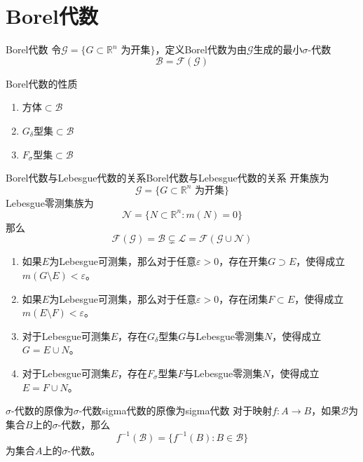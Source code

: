 \documentclass[lang = cn, scheme = chinese, thmcnt = section]{elegantbook}
\newcommand{\R}{\mathbb{R}}            %
\newcommand{\sub}{\subset}             %
\begin{document}
\section{Borel代数}

\begin{definition}{Borel代数}
	令$\mathscr{G}=\{ G\sub\R^n\text{ 为开集} \}$，定义Borel代数为由$\mathscr{G}$生成的最小$\sigma$-代数
	$$
	\mathscr{B}=\mathscr{F}(\mathscr{G})
	$$
\end{definition}

\begin{proposition}{Borel代数的性质}
	\begin{enumerate}
		\item 方体$\sub\mathscr{B}$
		\item $G_\delta$型集$\sub\mathscr{B}$
		\item $F_\sigma$型集$\sub\mathscr{B}$
	\end{enumerate}
\end{proposition}

\begin{theorem}{Borel代数与Lebesgue代数的关系}{Borel代数与Lebesgue代数的关系}
	开集族为
	$$
	\mathscr{G}=\{ G\sub\R^n\text{ 为开集} \}
	$$
	Lebesgue零测集族为
	$$
	\mathscr{N}=\{ N\sub\R^n:m(N)=0 \}
	$$
	那么
	$$
	\mathscr{F}(\mathscr{G})
	=\mathscr{B}
	\subsetneq\mathscr{L}
	=\mathscr{F}(\mathscr{G}\cup\mathscr{N})
	$$
	\begin{enumerate}
		\item 如果$E$为Lebesgue可测集，那么对于任意$\varepsilon>0$，存在开集$G\supset E$，使得成立$m(G\setminus E)<\varepsilon$。
		\item 如果$E$为Lebesgue可测集，那么对于任意$\varepsilon>0$，存在闭集$F\sub E$，使得成立$m(E\setminus F)<\varepsilon$。
		\item 对于Lebesgue可测集$E$，存在$G_\delta$型集$G$与Lebesgue零测集$N$，使得成立$G=E\cup N$。
		\item 对于Lebesgue可测集$E$，存在$F_\sigma$型集$F$与Lebesgue零测集$N$，使得成立$E=F\cup N$。
	\end{enumerate}
\end{theorem}

\begin{theorem}{$\sigma$-代数的原像为$\sigma$-代数}{sigma代数的原像为sigma代数}
	对于映射$f:A\to B$，如果$\mathscr{B}$为集合$B$上的$\sigma$-代数，那么%
	$$
	f^{-1}(\mathscr{B})=\{ f^{-1}(B):B\in \mathscr{B} \}
	$$
	为集合$A$上的$\sigma$-代数。
\end{theorem}
\end{document}
